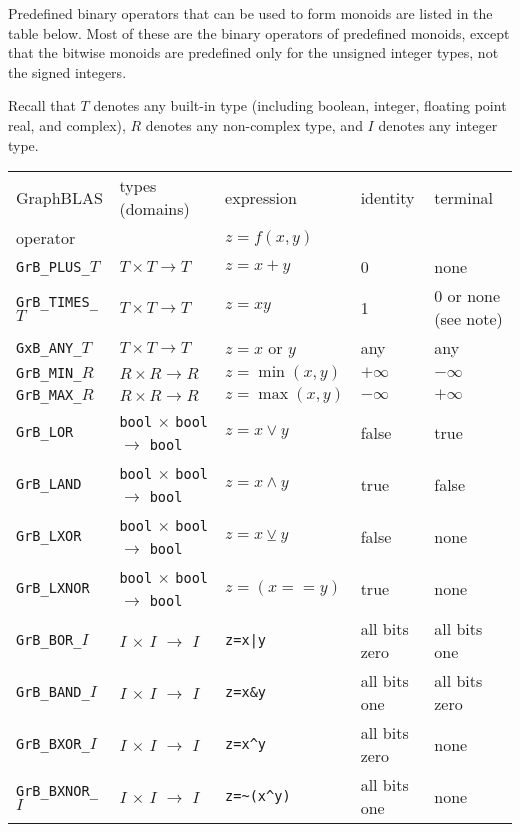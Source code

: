 \documentclass[12pt]{article}
\begin{document}
Predefined binary operators that can be used to form monoids are listed in the
table below.  Most of these are the binary operators of predefined monoids,
except that the bitwise monoids are predefined only for the unsigned integer
types, not the signed integers.

Recall that $T$ denotes any built-in type (including boolean, integer,
floating point real, and complex), $R$ denotes any non-complex type, and
$I$ denotes any integer type.

\vspace{0.2in}
\noindent
{\footnotesize
\begin{tabular}{lllll}
\hline
GraphBLAS             & types (domains)            & expression      & identity  & terminal \\
operator              &                            & $z=f(x,y)$      &           & \\
\hline
\verb'GrB_PLUS_'$T$   & $T \times T \rightarrow T$ & $z = x+y$       & 0         & none \\
\verb'GrB_TIMES_'$T$  & $T \times T \rightarrow T$ & $z = xy$        & 1         & 0 or none (see note) \\
\verb'GxB_ANY_'$T$    & $T \times T \rightarrow T$ & $z = x$ or $y$  & any       & any        \\
\hline
\verb'GrB_MIN_'$R$    & $R \times R \rightarrow R$ & $z = \min(x,y)$ & $+\infty$ & $-\infty$ \\
\verb'GrB_MAX_'$R$    & $R \times R \rightarrow R$ & $z = \max(x,y)$ & $-\infty$ & $+\infty$ \\
\hline
\verb'GrB_LOR'        & \verb'bool' $\times$ \verb'bool' $\rightarrow$ \verb'bool' & $z = x \vee    y $ & false & true  \\
\verb'GrB_LAND'       & \verb'bool' $\times$ \verb'bool' $\rightarrow$ \verb'bool' & $z = x \wedge  y $ & true  & false \\
\verb'GrB_LXOR'       & \verb'bool' $\times$ \verb'bool' $\rightarrow$ \verb'bool' & $z = x \veebar y $ & false & none \\
\verb'GrB_LXNOR'      & \verb'bool' $\times$ \verb'bool' $\rightarrow$ \verb'bool' & $z =(x ==      y)$ & true  & none \\
\hline
\verb'GrB_BOR_'$I$    & $I$ $\times$ $I$ $\rightarrow$ $I$ & \verb'z=x|y'    & all bits zero & all bits one  \\
\verb'GrB_BAND_'$I$   & $I$ $\times$ $I$ $\rightarrow$ $I$ & \verb'z=x&y'    & all bits one  & all bits zero \\
\verb'GrB_BXOR_'$I$   & $I$ $\times$ $I$ $\rightarrow$ $I$ & \verb'z=x^y'    & all bits zero & none \\
\verb'GrB_BXNOR_'$I$  & $I$ $\times$ $I$ $\rightarrow$ $I$ & \verb'z=~(x^y)' & all bits one  & none \\
\hline
\end{tabular}
}
\vspace{0.2in}
\end{document}
